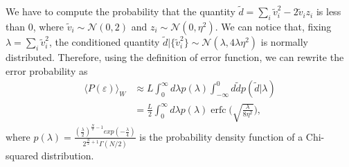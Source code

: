 \documentclass[a4paper]{article}%
\DeclareMathOperator\erfc{erfc}
\begin{document}
We have to compute the probability that the quantity $\tilde{d} = \sum_{i}
\tilde{v}_{i}^{2} - 2\tilde{v}_{i} z_{i}$ is less than 0, where $\tilde{v}_{i}
\sim\mathcal{N}(0,2)$ and $z_{i} \sim\mathcal{N}(0,\eta^{2})$. We can notice
that, fixing $\lambda= \sum_{i} \tilde{v}^{2}_{i}$, the conditioned quantity
$\tilde{d}|\{\tilde{v}_{i}^{2}\} \sim\mathcal{N}(\lambda,4\lambda\eta^{2}) $
is normally distributed. Therefore, using the definition of error function, we
can rewrite the error probability as
\begin{equation}%
\begin{split}
\langle P(\varepsilon)\rangle_{W}  & \approx L\int_{0}^{\infty}d\lambda
p(\lambda) \int_{-\infty}^{0} d\tilde{d} p(\tilde{d}|\lambda)\\
& = \frac{L}{2}\int_{0}^{\infty}d\lambda p(\lambda)
\erfc{\Big(\sqrt{\frac{\lambda}{8\eta^2}}\Big)},
\end{split}
\end{equation}
where $p(\lambda) = \frac{(\frac{\lambda}{2})^{\frac{N}{2}-1}exp(-\frac
{\lambda}{4})}{2^{\frac{N}{2}+1} \Gamma(N/2)}$ is the probability density
function of a Chi-squared distribution.
\end{document}
